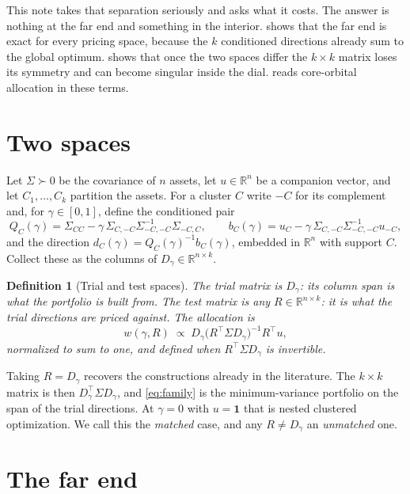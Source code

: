 \documentclass[11pt]{article}
\newcommand{\R}{\mathbb{R}}
\newcommand{\ones}{\mathbf{1}}
\newtheorem{definition}{Definition}
\begin{document}
This note takes that separation seriously and asks what it costs. The answer is
nothing at the far end and something in the interior.  shows that
the far end is exact for every pricing space, because the $k$ conditioned
directions already sum to the global optimum.  shows that
once the two spaces differ the $k\times k$ matrix loses its symmetry and can
become singular inside the dial.  reads core-orbital allocation
in these terms.

\section{Two spaces}

Let $\Sigma\succ0$ be the covariance of $n$ assets, let $u\in\R^n$ be a
companion vector, and let $C_1,\dots,C_k$ partition the assets. For a cluster
$C$ write $-C$ for its complement and, for $\gamma\in[0,1]$, define the
conditioned pair
\begin{equation}
  Q_C(\gamma)=\Sigma_{CC}-\gamma\,\Sigma_{C,-C}\Sigma_{-C,-C}^{-1}\Sigma_{-C,C},
  \qquad
  b_C(\gamma)=u_C-\gamma\,\Sigma_{C,-C}\Sigma_{-C,-C}^{-1}u_{-C},
  \label{eq:pair}
\end{equation}
and the direction $d_C(\gamma)=Q_C(\gamma)^{-1}b_C(\gamma)$, embedded in $\R^n$
with support $C$. Collect these as the columns of $D_\gamma\in\R^{n\times k}$.

\begin{definition}[Trial and test spaces]
The \emph{trial} matrix is $D_\gamma$: its column span is what the portfolio is
built from. The \emph{test} matrix is any $R\in\R^{n\times k}$: it is what the
trial directions are priced against. The allocation is
\begin{equation}
  w(\gamma,R)\;\propto\;D_\gamma\big(R^\top\Sigma D_\gamma\big)^{-1}R^\top u ,
  \label{eq:family}
\end{equation}
normalized to sum to one, and defined when $R^\top\Sigma D_\gamma$ is
invertible.
\end{definition}

Taking $R=D_\gamma$ recovers the constructions already in the literature. The
$k\times k$ matrix is then $D_\gamma^\top\Sigma D_\gamma$, and \eqref{eq:family}
is the minimum-variance portfolio on the span of the trial directions. At
$\gamma=0$ with $u=\ones$ that is nested clustered optimization. We call this
the \emph{matched} case, and any $R\neq D_\gamma$ an \emph{unmatched} one.

\section{The far end}
\label{sec:far}
\end{document}
